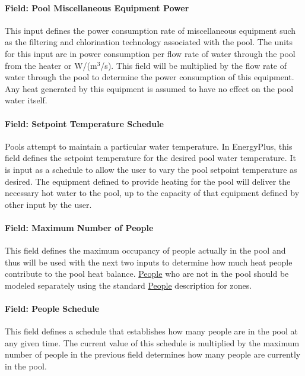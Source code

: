\paragraph{Field: Pool Miscellaneous Equipment Power}\label{field-pool-miscellaneous-equipment-power}

This input defines the power consumption rate of miscellaneous equipment such as the filtering and chlorination technology associated with the pool. The units for this input are in power consumption per flow rate of water through the pool from the heater or W/(m\(^{3}\)/s). This field will be multiplied by the flow rate of water through the pool to determine the power consumption of this equipment. Any heat generated by this equipment is assumed to have no effect on the pool water itself.

\paragraph{Field: Setpoint Temperature Schedule}\label{field-setpoint-temperature-schedule}

Pools attempt to maintain a particular water temperature. In EnergyPlus, this field defines the setpoint temperature for the desired pool water temperature. It is input as a schedule to allow the user to vary the pool setpoint temperature as desired. The equipment defined to provide heating for the pool will deliver the necessary hot water to the pool, up to the capacity of that equipment defined by other input by the user.

\paragraph{Field: Maximum Number of People}\label{field-maximum-number-of-people}

This field defines the maximum occupancy of people actually in the pool and thus will be used with the next two inputs to determine how much heat people contribute to the pool heat balance. \hyperref[people]{People} who are not in the pool should be modeled separately using the standard \hyperref[people]{People} description for zones.

\paragraph{Field: People Schedule}\label{field-people-schedule}

This field defines a schedule that establishes how many people are in the pool at any given time. The current value of this schedule is multiplied by the maximum number of people in the previous field determines how many people are currently in the pool.

